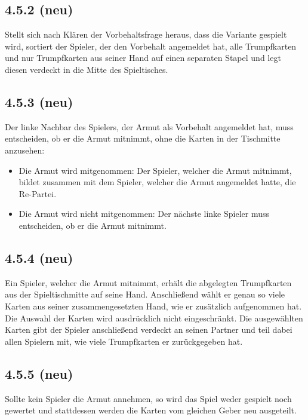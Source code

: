 \subsection*{4.5.2 (neu)}

Stellt sich nach Klären der Vorbehaltsfrage heraus, dass die Variante
 gespielt wird, sortiert der Spieler, der den Vorbehalt
angemeldet hat, alle Trumpfkarten und nur Trumpfkarten aus seiner Hand
auf einen separaten Stapel und legt diesen verdeckt in die Mitte des
Spieltisches.

\subsection*{4.5.3 (neu)}

Der linke Nachbar des Spielers, der Armut als Vorbehalt angemeldet hat,
muss entscheiden, ob er die Armut mitnimmt, ohne die Karten in der
Tischmitte anzusehen:

\begin{itemize}
    \item Die Armut wird mitgenommen: Der Spieler, welcher die Armut
        mitnimmt, bildet zusammen mit dem Spieler, welcher die Armut
        angemeldet hatte, die Re-Partei.
    \item Die Armut wird nicht mitgenommen: Der nächste linke Spieler
        muss entscheiden, ob er die Armut mitnimmt.
\end{itemize}

\subsection*{4.5.4 (neu)}

Ein Spieler, welcher die Armut mitnimmt, erhält die abgelegten
Trumpfkarten aus der Spieltischmitte auf seine Hand. Anschließend
wählt er genau so viele Karten aus seiner zusammengesetzten Hand, wie
er zusätzlich aufgenommen hat. Die Auswahl der Karten wird
ausdrücklich nicht eingeschränkt. Die ausgewählten Karten gibt der
Spieler anschließend verdeckt an seinen Partner und teil dabei allen
Spielern mit, wie viele Trumpfkarten er zurückgegeben hat.

\subsection*{4.5.5 (neu)}

Sollte kein Spieler die Armut annehmen, so wird das Spiel weder gespielt
noch gewertet und stattdessen werden die Karten vom gleichen Geber neu
ausgeteilt.

